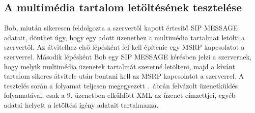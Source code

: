 \subsection{A multimédia tartalom letöltésének tesztelése}
\label{sec:teszteles_letoltes}

Bob, miután sikeresen feldolgozta a szervertől kapott értesítő SIP MESSAGE adatait, dönthet úgy, hogy egy adott üzenethez a multimédia tartalmat letölti a szervertől. Az átvitelhez első lépésként fel kell építenie egy MSRP kapcsolatot a szerverrel. Második lépésként Bob egy SIP MESSAGE kérésben jelzi a szervernek, hogy melyik multimédia üzenetek tartalmát szeretné letölteni, majd a kívánt tartalom sikeres átvitele után bontani kell az MSRP kapcsolatot a szerverrel. A tesztelés során a folyamat teljesen megegyezett .~ábrán felvázolt üzenetküldés folyamatával, csak a 9. üzenetben elküldött XML az üzenet címzettjei, egyéb adatai helyett a letöltési igény adatait tartalmazza.